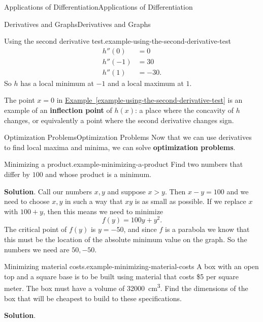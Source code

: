 \documentclass[10pt,]{book}
\newcommand{\terminology}[1]{\textbf{#1}}
\numberwithin{equation}{section}
\begin{document}
\begin{chapterptx}{Applications of Differentiation}{}{Applications of Differentiation}{}{}
\begin{sectionptx}{Derivatives and Graphs}{}{Derivatives and Graphs}{}{}
\begin{example}{Using the second derivative test.}{example-using-the-second-derivative-test}
\begin{align*}
h''(0) & = 0 \\
h''(-1) & = 30 \\
h''(1) & = -30. 
\end{align*}
So \(h\) has a local minimum at \(-1\) and a local maximum at \(1\).%
\end{example}
\hypertarget{p-354}{}%
The point \(x=0\) in \hyperref[example-using-the-second-derivative-test]{Example~\ref{example-using-the-second-derivative-test}} is an example of an \terminology{inflection point} of \(h(x)\): a place where the concavity of \(h\) changes, or equivalently a point where the second derivative changes sign.%
\end{sectionptx}
%
%
\typeout{************************************************}
\typeout{************************************************}
%
\begin{sectionptx}{Optimization Problems}{}{Optimization Problems}{}{}\label{section-optimization-problems}
\hypertarget{p-355}{}%
Now that we can use derivatives to find local maxima and minima, we can solve \terminology{optimization problems}.%
\begin{example}{Minimizing a product.}{example-minimizing-a-product}%
\hypertarget{p-356}{}%
Find two numbers that differ by \(100\) and whose product is a minimum.%
\par\smallskip%
\noindent\textbf{Solution}.\hypertarget{solution-78}{}\quad%
\hypertarget{p-357}{}%
Call our numbers \(x,y\) and suppose \(x > y\). Then \(x-y = 100\) and we need to choose \(x,y\) in such a way that \(xy\) is as small as possible. If we replace \(x\) with \(100+y\), then this means we need to minimize%
\begin{equation*}
f(y) = 100y + y^{2}.
\end{equation*}
The critical point of \(f(y)\) is \(y = -50\), and since \(f\) is a parabola we know that this must be the location of the absolute minimum value on the graph. So the numbers we need are \(50,-50\).%
\end{example}
\begin{example}{Minimizing material costs.}{example-minimizing-material-costs}%
\hypertarget{p-358}{}%
A box with an open top and a square base is to be built using material that costs \$5 per square meter. The box must have a volume of \SI{32000}{\centi\meter\tothe{3}}. Find the dimensions of the box that will be cheapest to build to these specifications.%
\par\smallskip%
\noindent\textbf{Solution}.\hypertarget{solution-79}{}\quad%

\end{example}
\end{sectionptx}
\end{chapterptx}
\end{document}
